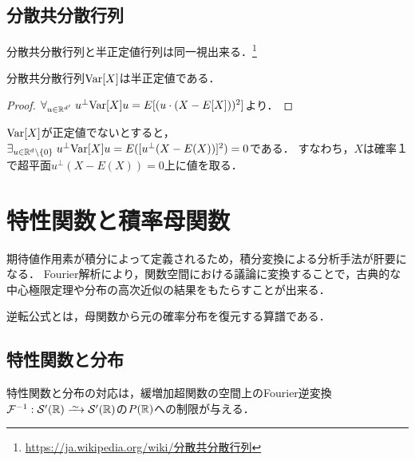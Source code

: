 \documentclass[uplatex,dvipdfmx]{jsreport}
\begin{document}
\subsection{分散共分散行列}

\begin{tcolorbox}[colframe=ForestGreen, colback=ForestGreen!10!white,breakable,colbacktitle=ForestGreen!40!white,coltitle=black,fonttitle=\bfseries\sffamily,
title=]
    分散共分散行列と半正定値行列は同一視出来る．\footnote{\url{https://ja.wikipedia.org/wiki/分散共分散行列}}
\end{tcolorbox}

\begin{lemma}
    分散共分散行列$\mathrm{Var}[X]$は半正定値である．
\end{lemma}
\begin{proof}
    $\forall_{u\in\mathbb{R}^{d'}}\;u^\perp\mathrm{Var}[X]u=E[(u\cdot(X-E[X]))^2]$より．
\end{proof}
\begin{remark}[退化した多次元確率変数]
    $\mathrm{Var}[X]$が正定値でないとすると，$\exists_{u\in\mathbb{R}^d\setminus\{0\}}\;u^\perp\mathrm{Var}[X]u=E([u^\perp(X-E(X))]^2)=0$である．
    すなわち，$X$は確率１で超平面$u^\perp(X-E(X))=0$上に値を取る．
\end{remark}

\section{特性関数と積率母関数}

\begin{tcolorbox}[colframe=ForestGreen, colback=ForestGreen!10!white,breakable,colbacktitle=ForestGreen!40!white,coltitle=black,fonttitle=\bfseries\sffamily,
title=積分変換]
    期待値作用素が積分によって定義されるため，積分変換による分析手法が肝要になる．
    Fourier解析により，関数空間における議論に変換することで，古典的な中心極限定理や分布の高次近似の結果をもたらすことが出来る．

    逆転公式とは，母関数から元の確率分布を復元する算譜である．
\end{tcolorbox}

\subsection{特性関数と分布}

\begin{tcolorbox}[colframe=ForestGreen, colback=ForestGreen!10!white,breakable,colbacktitle=ForestGreen!40!white,coltitle=black,fonttitle=\bfseries\sffamily,
title=]
    特性関数と分布の対応は，緩増加超関数の空間上のFourier逆変換$\F^{-1}:\cS'(\R)\iso\cS'(\R)$の$P(\mathbb{R})$への制限が与える．
\end{tcolorbox}
\end{document}
